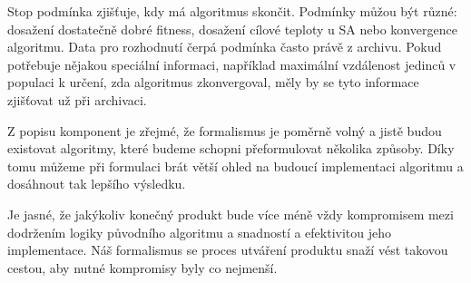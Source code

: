 Stop podmínka zjišťuje, kdy má algoritmus skončit. Podmínky můžou být různé: dosažení dostatečně dobré fitness, dosažení cílové teploty u SA nebo konvergence algoritmu. Data pro rozhodnutí čerpá podmínka často právě z archivu. Pokud potřebuje nějakou speciální informaci, například maximální vzdálenost jedinců v populaci k určení, zda algoritmus zkonvergoval, měly by se tyto informace zjišťovat už při archivaci.

\vspace{1cm}
Z popisu komponent je zřejmé, že formalismus je poměrně volný a jistě budou existovat algoritmy, které budeme schopni přeformulovat několika způsoby. Díky tomu můžeme při formulaci brát větší ohled na budoucí implementaci algoritmu a dosáhnout tak lepšího výsledku.

Je jasné, že jakýkoliv konečný produkt bude více méně vždy kompromisem mezi dodržením logiky původního algoritmu a snadností a efektivitou jeho implementace. Náš formalismus se proces utváření produktu snaží vést takovou cestou, aby nutné kompromisy byly co nejmenší. 
